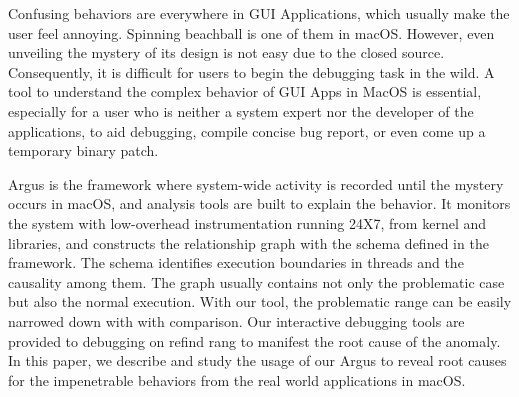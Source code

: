 Confusing behaviors are everywhere in GUI Applications, which usually make the user feel annoying.
Spinning beachball is one of them in macOS.
However, even unveiling the mystery of its design is not easy due to the closed source.
Consequently, it is difficult for users to begin the debugging task in the wild.
A tool to understand the complex behavior of GUI Apps in MacOS is essential, especially for a user who is neither a system expert nor the developer of the applications, to aid debugging, compile concise bug report, or even come up a temporary binary patch.

Argus is the framework where system-wide activity is recorded until the mystery occurs in macOS, and analysis tools are built to explain the behavior.
It monitors the system with low-overhead instrumentation running 24X7, from kernel and libraries, and constructs the relationship graph with the schema defined in the framework.
The schema identifies execution boundaries in threads and the causality among them.
The graph usually contains not only the problematic case but also the normal execution.
With our tool, the problematic range can be easily narrowed down with with comparison.
Our interactive debugging tools are provided to debugging on refind rang to manifest the root cause of the anomaly.
In this paper, we describe and study the usage of our Argus to reveal root causes for the impenetrable behaviors from the real world applications in macOS.
